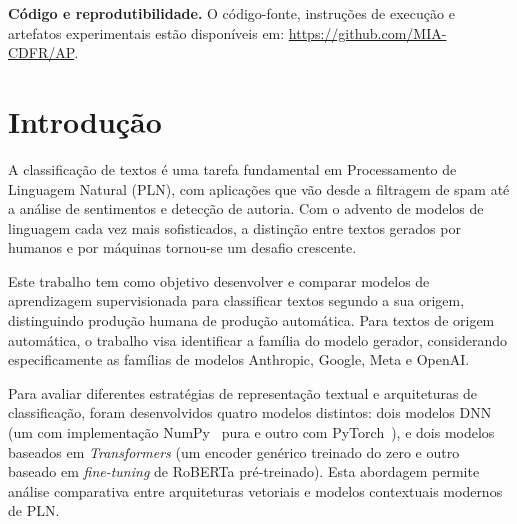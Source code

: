 \documentclass[runningheads]{llncs}
\begin{document}
\noindent\textbf{Código e reprodutibilidade.}
O código-fonte, instruções de execução e artefatos experimentais estão disponíveis em:
\url{https://github.com/MIA-CDFR/AP}.
%
%
%
\section{Introdução}

A classificação de textos é uma tarefa fundamental em Processamento de Linguagem Natural (PLN), com aplicações que vão desde a filtragem de spam até a análise de sentimentos e detecção de autoria. Com o advento de modelos de linguagem cada vez mais sofisticados, a distinção entre textos gerados por humanos e por máquinas tornou-se um desafio crescente.

Este trabalho tem como objetivo desenvolver e comparar modelos de aprendizagem supervisionada para classificar textos segundo a sua origem, distinguindo produção humana de produção automática. Para textos de origem automática, o trabalho visa identificar a família do modelo gerador, considerando especificamente as famílias de modelos Anthropic, Google, Meta e OpenAI.

Para avaliar diferentes estratégias de representação textual e arquiteturas de classificação, foram desenvolvidos quatro modelos distintos: dois modelos DNN (um com implementação NumPy~\cite{ref_numpy} pura e outro com PyTorch~\cite{ref_pytorch}), e dois modelos baseados em \textit{Transformers} (um encoder genérico treinado do zero e outro baseado em \textit{fine-tuning} de RoBERTa pré-treinado). Esta abordagem permite análise comparativa entre arquiteturas vetoriais e modelos contextuais modernos de PLN.
\end{document}
